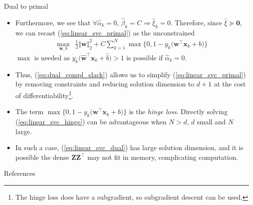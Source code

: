 \documentclass{beamer}
\numberwithin{equation}{section}
\newcommand{\aref}[1]{\alert{\ref{#1}}}
\begin{document}
\begin{frame}{Dual to primal}
    \begin{itemize}
        \item
        Furthermore, we see that $ \forall\hat{\alpha}_k = 0 $,
        $ \hat{\beta}_k = C \Rightarrow \hat{\xi}_k = 0 $. Therefore,
        since $ \hat{\xi} \succeq \mathbf{0} $, we can recast
        (\aref{eq:linear_svc_primal}) as the unconstrained
        \begin{equation} \label{eq:linear_svc_hinge}
            \begin{array}{ll}
                \displaystyle\max_{\mathbf{w}, b} &
                \displaystyle\frac{1}{2}\Vert\mathbf{w}\Vert_2^2 +
                C\sum_{k = 1}^N\max\big\{
                    0, 1 - y_k\big(\mathbf{w}^\top\mathbf{x}_k + b\big)
                \big\}
            \end{array}
        \end{equation}
        $ \max $ is needed as $ y_k\big(\hat{\mathbf{w}}^\top\mathbf{x}_k +
        \hat{b}\big) > 1 $ is possible if $ \hat{\alpha}_k = 0 $.

        \item
        Thus, (\aref{eq:dual_compl_slack}) allows us to simplify
        (\aref{eq:linear_svc_primal}) by removing constraints and reducing
        solution dimension to $ d + 1 $ at the cost of
        differentiability\footnote{
            The hinge loss does have a subgradient, so subgradient descent
            can be used.        
        }.

        \item
        The term $ \max\big\{0, 1 - y_k\big(\mathbf{w}^\top\mathbf{x}_k +
        b\big)\big\} $ is the \textit{hinge loss}. Directly solving
        (\aref{eq:linear_svc_hinge}) can be advantageous when $ N > d $,
        $ d $ small and $ N $ large.

        \item
        In such a case, (\aref{eq:linear_svc_dual}) has large solution
        dimension, and it is possible the dense $ \mathbf{ZZ}^\top $ may
        not fit in memory, complicating computation.
    \end{itemize}

    \medskip
\end{frame}

%

\begin{frame}{References}
    
    
\end{frame}
\end{document}
